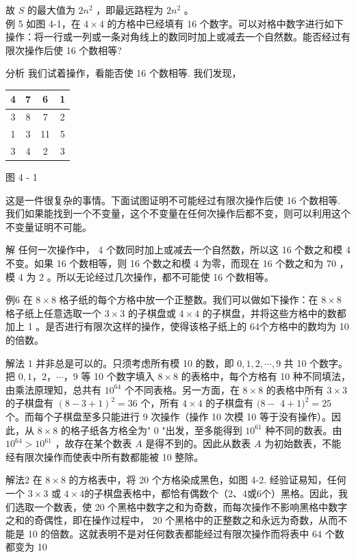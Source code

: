 \documentclass[10pt]{article}
\begin{document}
故 $S$ 的最大值为 $2 n^{2}$ ，即最远路程为 $2 n^{2}$ 。\\
例 5 如图 4-1，在 $4 \times 4$ 的方格中已经填有 16 个数字。可以对格中数字进行如下操作：将一行或一列或一条对角线上的数同时加上或减去一个自然数。能否经过有限次操作后使 16 个数相等?

分析 我们试着操作，看能否使 16 个数相等. 我们发现，

\begin{center}
\begin{tabular}{|c|c|c|c|}
\hline
4 & 7 & 6 & 1 \\
\hline
3 & 8 & 7 & 2 \\
\hline
1 & 3 & 11 & 5 \\
\hline
3 & 4 & 2 & 3 \\
\hline
\end{tabular}
\end{center}

图 4 - 1

这是一件很复杂的事情。下面试图证明不可能经过有限次操作后使 16 个数相等. 我们如果能找到一个不变量，这个不变量在任何次操作后都不变，则可以利用这个不变量证明不可能。

解 任何一次操作中， 4 个数同时加上或减去一个自然数，所以这 16 个数之和模 4 不变。如果 16 个数相等，则 16 个数之和模 4 为零，而现在 16 个数之和为 70 ，模 4 为 2 。所以无论经过几次操作，都不可能使 16 个数相等。

例6 在 $8 \times 8$ 格子纸的每个方格中放一个正整数。我们可以做如下操作：在 $8 \times 8$ 格子纸上任意选取一个 $3 \times 3$ 的子棋盘或 $4 \times 4$ 的子棋盘，并将这些方格中的数都加上 1 。是否进行有限次这样的操作，使得该格子纸上的 64个方格中的数均为 10 的倍数。

解法 1 并非总是可以的。只须考虑所有模 10 的数，即 $0,1,2, \cdots, 9$ 共 10 个数字。把 $0,1 ， 2 ， \cdots ， 9$ 等 10 个数字填入 $8 \times 8$ 的表格中，每个方格有 10 种不同填法，由乘法原理知，总共有 $10^{64}$ 个不同表格。另一方面，在 $8 \times 8$ 的表格中所有 $3 \times 3$ 的子棋盘有 $(8-3+1)^{2}=36$ 个，所有 $4 \times 4$ 的子棋盘有 $(8-$ $4+1)^{2}=25$ 个。而每个子棋盘至多只能进行 9 次操作（操作 10 次模 10 等于没有操作）。因此，从 $8 \times 8$ 的格子纸各方格全为" 0 "出发，至多能得到 $10^{61}$ 种不同的数表。由 $10^{64}>10^{61}$ ，故存在某个数表 $A$ 是得不到的。因此从数表 $A$ 为初始数表，不能经有限次操作而使表中所有数都能被 10 整除。

解法2 在 $8 \times 8$ 的方格表中，将 20 个方格染成黑色，如图 4-2. 经验证易知，任何一个 $3 \times 3$ 或 $4 \times 4$的子棋盘表格中，都恰有偶数个（2、4或6个）黑格。因此，我们选取一个数表，使 20 个黑格中数字之和为奇数，而每次操作不影响黑格中数字之和的奇偶性，即在操作过程中， 20 个黑格中的正整数之和永远为奇数，从而不能是 10 的倍数。这就表明不是对任何数表都能经过有限次操作而将表中 64 个数都变为 10
\end{document}
